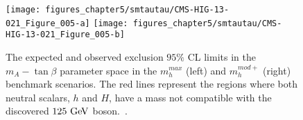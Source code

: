 \begin{figure}[htbp]
\centering
\texttt{[image: figures\_chapter5/smtautau/CMS-HIG-13-021\_Figure\_005-a]}
\texttt{[image: figures\_chapter5/smtautau/CMS-HIG-13-021\_Figure\_005-b]}
\caption{The expected and observed exclusion $95\%$ CL limits in the $m_{A}-\tan\beta$ parameter space in the $m_h^{max}$ (left) and $m_{h}^{mod+}$ (right) benchmark scenarios. The red lines represent the regions where both neutral scalars, $h$ and $H$, have a mass not compatible with the discovered $125~\mathrm{Ge\kern -0.1em V}$ boson.~\cite{Khachatryan:2014wca}.}
\label{fig:mssmlimit}
\end{figure}


